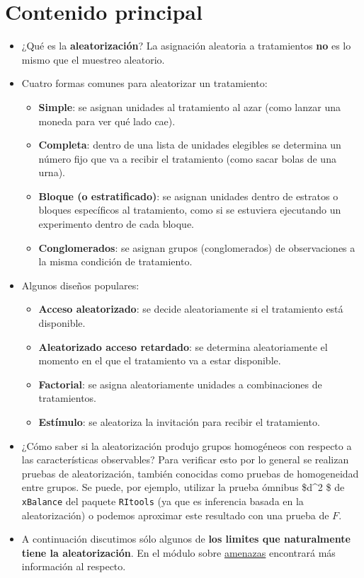 \documentclass[12pt,spanish,]{book}
\begin{document}
\hypertarget{contenido-principal-2}{%
\section{Contenido principal}\label{contenido-principal-2}}

\begin{itemize}
\item
  ¿Qué es la \textbf{aleatorización}? La asignación aleatoria a tratamientos \textbf{no} es lo mismo que el muestreo aleatorio.
\item
  Cuatro formas comunes para aleatorizar un tratamiento:

  \begin{itemize}
  \item
    \textbf{Simple}: se asignan unidades al tratamiento al azar (como lanzar una moneda para ver qué lado cae).
  \item
    \textbf{Completa}: dentro de una lista de unidades elegibles se determina un número fijo que va a recibir el tratamiento (como sacar bolas de una urna).
  \item
    \textbf{Bloque (o estratificado)}: se asignan unidades dentro de estratos o bloques específicos al tratamiento, como si se estuviera ejecutando un experimento dentro de cada bloque.
  \item
    \textbf{Conglomerados}: se asignan grupos (conglomerados) de observaciones a la misma condición de tratamiento.
  \end{itemize}
\item
  Algunos diseños populares:

  \begin{itemize}
  \item
    \textbf{Acceso aleatorizado}: se decide aleatoriamente si el tratamiento está disponible.
  \item
    \textbf{Aleatorizado acceso retardado}: se determina aleatoriamente el momento en el que el tratamiento va a estar disponible.
  \item
    \textbf{Factorial}: se asigna aleatoriamente unidades a combinaciones de tratamientos.
  \item
    \textbf{Estímulo}: se aleatoriza la invitación para recibir el tratamiento.
  \end{itemize}
\item
  ¿Cómo saber si la aleatorización produjo grupos homogéneos con respecto a las características observables? Para verificar esto por lo general se realizan pruebas de aleatorización, también conocidas como pruebas de homogeneidad entre grupos. Se puede, por ejemplo, utilizar la prueba ómnibus \$d\^{}2 \$ de \texttt{xBalance} del paquete \texttt{RItools} (ya que es inferencia basada en la aleatorización) o podemos aproximar este resultado con una prueba de \(F\).
\item
  A continuación discutimos sólo algunos de \textbf{los limites que naturalmente tiene la aleatorización}. En el módulo sobre \href{threats-to-internal-validity-of-randomized-experiments.html}{amenazas} encontrará más información al respecto.
\end{itemize}
\end{document}
